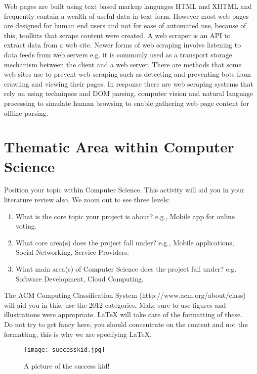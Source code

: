 Web pages are built using text based markup languages HTML and XHTML and frequently contain a wealth of useful data in text form. However most web pages are designed for human end users and not for ease of automated use, because of this, toolkits that scrape content were created. A web scraper is an API to extract data from a web site. Newer forms of web scraping involve listening to data feeds from web servers e.g. it is commonly used as a transport storage mechanism between the client and a web server.
There are methods that some web sites use to prevent web scraping such as detecting and preventing bots from crawling and viewing their pages. In response there are web scraping systems that rely on using techniques and DOM parsing, computer vision and natural language processing to simulate human browsing to enable gathering web page content for offline parsing.




\section{Thematic Area within Computer Science}
Position your topic within Computer Science. This activity will aid you in your literature review also. We zoom out to see three levels: \cite{Barricelli2019}

\begin{enumerate}
    \item What is the core topic your project is about? e.g., Mobile app for online voting.
    \item What core area(s) does the project fall under? e.g., Mobile applications, Social Networking, Service Providers. 
    \item What main area(s) of Computer Science does the project fall under? e.g. Software Development, Cloud Computing.
\end{enumerate}

The ACM Computing Classification System (http://www.acm.org/about/class) will aid you in this, use the 2012 categories. Make sure to use figures and illustrations were appropriate. LaTeX will take care of the formatting of these. Do not try to get fancy here, you should concentrate on the content and not the formatting, this is why we are specifying LaTeX.

\begin{figure}[ht]
  \centering
      \texttt{[image: successkid.jpg]}
  \caption[A picture of the success kid!]{A picture of the success kid!\cite{Reference1}}
  \label{fig:successkid}
\end{figure}

